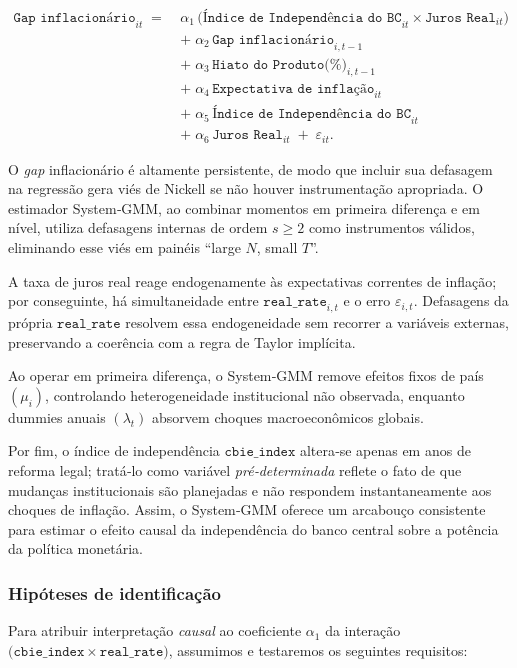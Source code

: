 \documentclass[a4paper,12pt]{article}[abnt2]
\begin{document}
\begin{equation}\label{eq:gmm_gap_order}
\begin{aligned}
\texttt{Gap inflacionário}_{it} \;=\;&
  \alpha_{1}\,\bigl(\texttt{Índice de Independência do BC}_{it}\times\texttt{Juros Real}_{it}\bigr)\\
&+\;\alpha_{2}\,\texttt{Gap inflacionário}_{i,t-1}\\
&+\;\alpha_{3}\,\texttt{Hiato do Produto(\%)}_{i,t-1}\\
&+\;\alpha_{4}\,\texttt{Expectativa de inflação}_{it}\\
&+\;\alpha_{5}\,\texttt{Índice de Independência do BC}_{it}\\
&+\;\alpha_{6}\,\texttt{Juros Real}_{it}
\;+\;\varepsilon_{it}.
\end{aligned}
\end{equation}

O \textit{gap} inflacionário é altamente persistente, de modo que incluir sua
defasagem na regressão gera viés de Nickell se não houver instrumentação
apropriada. O estimador System‑GMM, ao combinar momentos em primeira diferença
e em nível, utiliza defasagens internas de ordem \(s\ge2\) como instrumentos
válidos, eliminando esse viés em painéis “large \(N\), small \(T\)”.

A taxa de juros real reage endogenamente às expectativas correntes de
inflação; por conseguinte, há simultaneidade entre
\(\texttt{real\_rate}_{i,t}\) e o erro \(\varepsilon_{i,t}\). Defasagens da
própria \(\texttt{real\_rate}\) resolvem essa endogeneidade sem recorrer a
variáveis externas, preservando a coerência com a regra de Taylor implícita.

Ao operar em primeira diferença, o System‑GMM remove efeitos fixos de país
\((\mu_i)\), controlando heterogeneidade institucional não observada, enquanto
dummies anuais \((\lambda_t)\) absorvem choques macroeconômicos globais.

Por fim, o índice de independência
\(\texttt{cbie\_index}\) altera‑se apenas em anos de reforma legal; tratá‑lo
como variável \emph{pré‑determinada} reflete o fato de que mudanças
institucionais são planejadas e não respondem instantaneamente aos choques de
inflação. Assim, o System‑GMM oferece um arcabouço consistente para estimar o
efeito causal da independência do banco central sobre a potência da política
monetária.

\subsubsection{\textbf{Hipóteses de identificação}}
Para atribuir interpretação \emph{causal} ao coeficiente 
\(\alpha_{1}\) da interação
\(\bigl(\texttt{cbie\_index}\times\texttt{real\_rate}\bigr)\),
assumimos e testaremos os seguintes requisitos:
\end{document}
